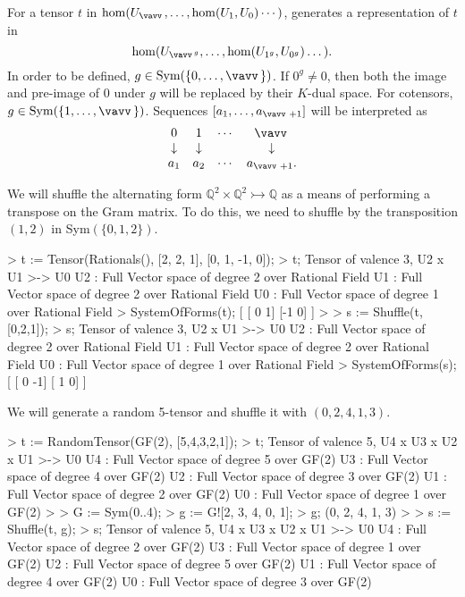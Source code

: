 For a tensor $t$ in $\hom(U_{\vav},\dots,\hom(U_1,U_0)\cdots)$, 
generates a representation of $t$ in 
\[ \hom(U_{{\vav}^g},\dots,\hom(U_{1^g},U_{0^g})\dots). \]
In order to be defined, $g\in\text{Sym}(\{0,\dots,\vav \})$. 
If $0^g\ne 0$, then both the image and pre-image of $0$ under $g$ will be replaced by their $K$-dual space.
For cotensors, $g\in\text{Sym}(\{1,\dots,\vav\})$.
Sequences $[a_1,\dots,a_{\vav+1}]$ will be interpreted as 
\[ \begin{array}{cccc} 0 & 1 & \cdots & \vav \\ \downarrow & \downarrow & & \downarrow \\ a_1 & a_2 & \cdots & a_{\vav+1}. \end{array}\]

\begin{example}[ShuffleToTranspose]

We will shuffle the alternating form $\mathbb{Q}^2\times\mathbb{Q}^2\rightarrowtail \mathbb{Q}$ as a means of performing a transpose on the Gram matrix.
To do this, we need to shuffle by the transposition $(1, 2)$ in Sym$(\{0,1,2\})$. 
\begin{code}
> t := Tensor(Rationals(), [2, 2, 1], [0, 1, -1, 0]);
> t;
Tensor of valence 3, U2 x U1 >-> U0
U2 : Full Vector space of degree 2 over Rational Field
U1 : Full Vector space of degree 2 over Rational Field
U0 : Full Vector space of degree 1 over Rational Field
> SystemOfForms(t);
[
    [ 0  1]
    [-1  0]
]
> 
> s := Shuffle(t, [0,2,1]);
> s;
Tensor of valence 3, U2 x U1 >-> U0
U2 : Full Vector space of degree 2 over Rational Field
U1 : Full Vector space of degree 2 over Rational Field
U0 : Full Vector space of degree 1 over Rational Field
> SystemOfForms(s);
[
    [ 0 -1]
    [ 1  0]
]
\end{code}
\end{example}

\begin{example}[Shuffling]

We will generate a random 5-tensor and shuffle it with $(0,2,4,1,3)$.
\begin{code}
> t := RandomTensor(GF(2), [5,4,3,2,1]);
> t;
Tensor of valence 5, U4 x U3 x U2 x U1 >-> U0
U4 : Full Vector space of degree 5 over GF(2)
U3 : Full Vector space of degree 4 over GF(2)
U2 : Full Vector space of degree 3 over GF(2)
U1 : Full Vector space of degree 2 over GF(2)
U0 : Full Vector space of degree 1 over GF(2)
> 
> G := Sym({0..4});
> g := G![2, 3, 4, 0, 1];
> g;
(0, 2, 4, 1, 3)
> 
> s := Shuffle(t, g);
> s;
Tensor of valence 5, U4 x U3 x U2 x U1 >-> U0
U4 : Full Vector space of degree 2 over GF(2)
U3 : Full Vector space of degree 1 over GF(2)
U2 : Full Vector space of degree 5 over GF(2)
U1 : Full Vector space of degree 4 over GF(2)
U0 : Full Vector space of degree 3 over GF(2)
\end{code}
\end{example}




